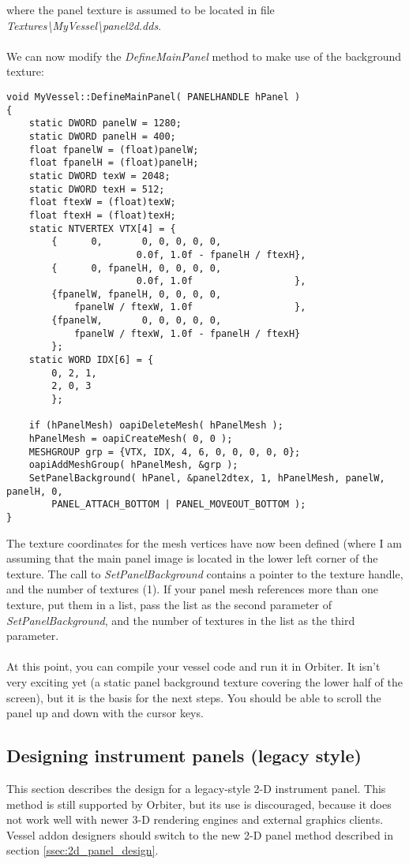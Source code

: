 \documentclass[Orbiter Developer Manual.tex]{subfiles}
\begin{document}
\noindent
where the panel texture is assumed to be located in file \textit{Textures\textbackslash MyVessel\textbackslash panel2d.dds}.\\
\\
We can now modify the \textit{DefineMainPanel} method to make use of the background texture:

\begin{lstlisting}
void MyVessel::DefineMainPanel( PANELHANDLE hPanel )
{
	static DWORD panelW = 1280;
	static DWORD panelH = 400;
	float fpanelW = (float)panelW;
	float fpanelH = (float)panelH;
	static DWORD texW = 2048;
	static DWORD texH = 512;
	float ftexW = (float)texW;
	float ftexH = (float)texH;
	static NTVERTEX VTX[4] = {
		{      0,       0, 0, 0, 0, 0,
			           0.0f, 1.0f - fpanelH / ftexH},
		{      0, fpanelH, 0, 0, 0, 0,
			           0.0f, 1.0f                  },
		{fpanelW, fpanelH, 0, 0, 0, 0,
			fpanelW / ftexW, 1.0f                  },
		{fpanelW,       0, 0, 0, 0, 0,
			fpanelW / ftexW, 1.0f - fpanelH / ftexH}
		};
	static WORD IDX[6] = {
		0, 2, 1,
		2, 0, 3
		};

	if (hPanelMesh) oapiDeleteMesh( hPanelMesh );
	hPanelMesh = oapiCreateMesh( 0, 0 );
	MESHGROUP grp = {VTX, IDX, 4, 6, 0, 0, 0, 0, 0};
	oapiAddMeshGroup( hPanelMesh, &grp );
	SetPanelBackground( hPanel, &panel2dtex, 1, hPanelMesh, panelW, panelH, 0,
		PANEL_ATTACH_BOTTOM | PANEL_MOVEOUT_BOTTOM );
}
\end{lstlisting}

\noindent
The texture coordinates for the mesh vertices have now been defined (where I am assuming that the main panel image is located in the lower left corner of the texture. The call to \textit{SetPanelBackground} contains a pointer to the texture handle, and the number of textures (1). If your panel mesh references more than one texture, put them in a list, pass the list as the second parameter of \textit{SetPanelBackground}, and the number of textures in the list as the third parameter.\\
\\
At this point, you can compile your vessel code and run it in Orbiter. It isn't very exciting yet (a static panel background texture covering the lower half of the screen), but it is the basis for the next steps. You should be able to scroll the panel up and down with the cursor keys.


\subsection{Designing instrument panels (legacy style)}
This section describes the design for a legacy-style 2-D instrument panel. This method is still supported by Orbiter, but its use is discouraged, because it does not work well with newer 3-D rendering engines and external graphics clients. Vessel addon designers should switch to the new 2-D panel method described in section \ref{ssec:2d_panel_design}.
\end{document}

